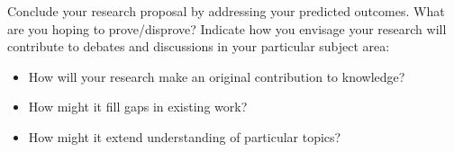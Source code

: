 Conclude your research proposal by addressing your predicted outcomes.
What are you hoping to prove/disprove?
Indicate how you envisage your research will contribute to debates and discussions in your particular subject area:

\begin{itemize}
    \item How will your research make an original contribution to knowledge?
    \item How might it fill gaps in existing work?
    \item How might it extend understanding of particular topics?
\end{itemize}
